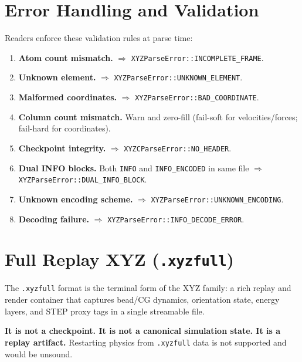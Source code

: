 \documentclass[12pt, a4paper, oneside]{article}
\newcommand{\type}[1]{\texttt{#1}}
\begin{document}
\section{Error Handling and Validation}
\label{sec:errors}

Readers enforce these validation rules at parse time:

\begin{enumerate}
  \item \textbf{Atom count mismatch.}  $\Rightarrow$ \type{XYZParseError::INCOMPLETE\_FRAME}.
  \item \textbf{Unknown element.}  $\Rightarrow$ \type{XYZParseError::UNKNOWN\_ELEMENT}.
  \item \textbf{Malformed coordinates.}  $\Rightarrow$ \type{XYZParseError::BAD\_COORDINATE}.
  \item \textbf{Column count mismatch.}  Warn and zero-fill (fail-soft for velocities/forces;
        fail-hard for coordinates).
  \item \textbf{Checkpoint integrity.}  $\Rightarrow$ \type{XYZCParseError::NO\_HEADER}.
  \item \textbf{Dual INFO blocks.}  Both \texttt{INFO} and \texttt{INFO\_ENCODED} in same
        file $\Rightarrow$ \type{XYZParseError::DUAL\_INFO\_BLOCK}.
  \item \textbf{Unknown encoding scheme.}  $\Rightarrow$ \type{XYZParseError::UNKNOWN\_ENCODING}.
  \item \textbf{Decoding failure.}  $\Rightarrow$ \type{XYZParseError::INFO\_DECODE\_ERROR}.
\end{enumerate}

\section{Full Replay XYZ (\texttt{.xyzfull})}
\label{sec:xyzfull}

The \texttt{.xyzfull} format is the terminal form of the XYZ family: a rich replay
and render container that captures bead/CG dynamics, orientation state, energy
layers, and STEP proxy tags in a single streamable file.

\textbf{It is not a checkpoint.  It is not a canonical simulation state.
It is a replay artifact.}  Restarting physics from \texttt{.xyzfull} data is
not supported and would be unsound.
\end{document}
